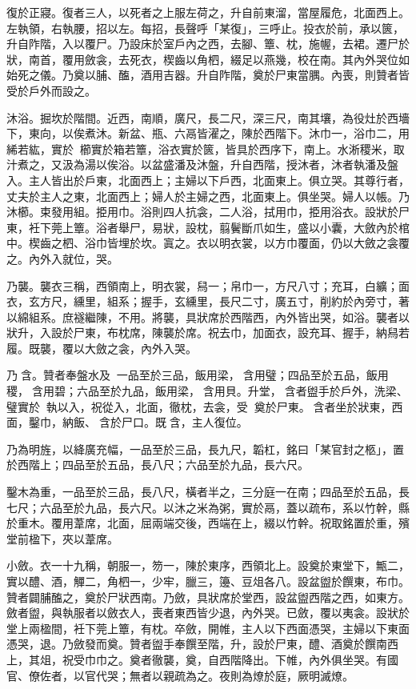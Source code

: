 \begin{pinyinscope}
 復於正寢。復者三人，以死者之上服左荷之，升自前東溜，當屋履危，北面西上。左執領，右執腰，招以左。每招，長聲呼「某復」，三呼止。投衣於前，承以篋，升自阼階，入以覆尸。乃設床於室戶內之西，去腳、簟、枕，施幄，去裙。遷尸於狀，南首，覆用斂衾，去死衣，楔齒以角柶，綴足以燕幾，校在南。其內外哭位如始死之儀。乃奠以脯、醢，酒用吉器。升自阼階，奠於尸東當腢。內喪，則贊者皆受於戶外而設之。



 沐浴。掘坎於階間。近西，南順，廣尺，長二尺，深三尺，南其壤，為役灶於西墻下，東向，以俟煮沐。新盆、瓶、六鬲皆濯之，陳於西階下。沐巾一，浴巾二，用絺若紘，實於，櫛實於箱若簟，浴衣實於篋，皆具於西序下，南上。水淅稷米，取汁煮之，又汲為湯以俟浴。以盆盛潘及沐盤，升自西階，授沐者，沐者執潘及盤入。主人皆出於戶東，北面西上；主婦以下戶西，北面東上。俱立哭。其尊行者，丈夫於主人之東，北面西上；婦人於主婦之西，北面東上。俱坐哭。婦人以帳。乃沐櫛。束發用組。挋用巾。浴則四人抗衾，二人浴，拭用巾，挋用浴衣。設狀於尸東，衽下莞上簟。浴者舉尸，易狀，設枕，翦鬢斷爪如生，盛以小囊，大斂內於棺中。楔齒之柶、浴巾皆埋於坎。寘之。衣以明衣裳，以方巾覆面，仍以大斂之衾覆之。內外入就位，哭。



 乃襲。襲衣三稱，西領南上，明衣裳，舄一；帛巾一，方尺八寸；充耳，白纊；面衣，玄方尺，纁里，組系；握手，玄纁里，長尺二寸，廣五寸，削約於內旁寸，著以綿組系。庶襚繼陳，不用。將襲，具狀席於西階西，內外皆出哭，如浴。襲者以狀升，入設於尸東，布枕席，陳襲於席。祝去巾，加面衣，設充耳、握手，納舄若履。既襲，覆以大斂之衾，內外入哭。



 乃含。贊者奉盤水及，一品至於三品，飯用梁，含用璧；四品至於五品，飯用稷，含用碧；六品至於九品，飯用梁，含用貝。升堂，含者盥手於戶外，洗梁、璧實於，執以入，祝從入，北面，徹枕，去衾，受，奠於尸東。含者坐於狀東，西面，鑿巾，納飯、含於尸口。既含，主人復位。



 乃為明旌，以絳廣充幅，一品至於三品，長九尺，韜杠，銘曰「某官封之柩」，置於西階上；四品至於五品，長八尺；六品至於九品，長六尺。



 鑿木為重，一品至於三品，長八尺，橫者半之，三分庭一在南；四品至於五品，長七尺；六品至於九品，長六尺。以沐之米為粥，實於鬲，蓋以疏布，系以竹幹，縣於重木。覆用葦席，北面，屈兩端交後，西端在上，綴以竹幹。祝取銘置於重，殯堂前楹下，夾以葦席。



 小斂。衣一十九稱，朝服一，笏一，陳於東序，西領北上。設奠於東堂下，甒二，實以醴、酒，觶二，角柶一，少牢，臘三，籩、豆俎各八。設盆盥於饌東，布巾。贊者闢脯醢之，奠於尸狀西南。乃斂，具狀席於堂西，設盆盥西階之西，如東方。斂者盥，與執服者以斂衣人，喪者東西皆少退，內外哭。已斂，覆以夷衾。設狀於堂上兩楹間，衽下莞上簟，有枕。卒斂，開帷，主人以下西面憑哭，主婦以下東面憑哭，退。乃斂發而奠。贊者盥手奉饌至階，升，設於尸東，醴、酒奠於饌南西上，其俎，祝受巾巾之。奠者徹襲，奠，自西階降出。下帷，內外俱坐哭。有國官、僚佐者，以官代哭；無者以親疏為之。夜則為燎於庭，厥明滅燎。




\end{pinyinscope}
